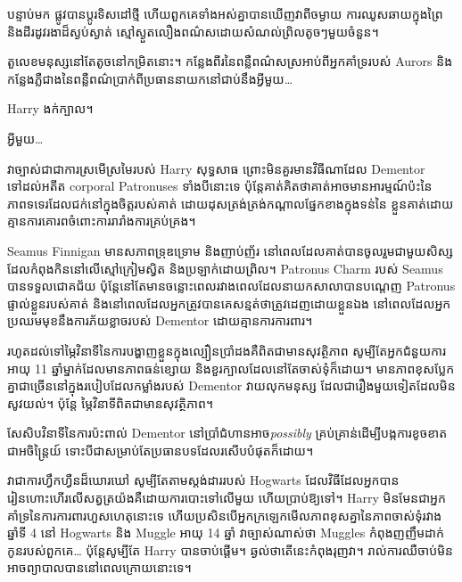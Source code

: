 បន្ទាប់មក ផ្លូវបានប្តូរទិសដៅថ្មី ហើយពួកគេទាំងអស់គ្នាបានឃើញវាពីចម្ងាយ ការឈូសឆាយក្នុងព្រៃ និងដីរដូវរងាដ៏ស្ងប់ស្ងាត់ ស្មៅស្ងួតលឿងពណ៌សដោយសំណល់ព្រិលតូចៗមួយចំនួន។

តួលេខ​មនុស្ស​នៅ​តែ​តូច​នៅ​កម្រិត​នោះ។ កន្លែង​ពីរ​នៃ​ពន្លឺ​ពណ៌​ស​ស្រអាប់​ពី​អ្នក​គាំទ្រ​របស់ Aurors និង​កន្លែង​ភ្លឺ​ជាង​នៃ​ពន្លឺ​ពណ៌​ប្រាក់​ពី​ប្រធាន​នាយក​នៅ​ជាប់​នឹង​អ្វី​មួយ…

Harry ងក់ក្បាល។

អ្វីមួយ…

វាច្បាស់ជាជាការស្រមើស្រមៃរបស់ Harry សុទ្ធសាធ ព្រោះមិនគួរមានវិធីណាដែល Dementor ទៅដល់អតីត corporal Patronuses ទាំងបីនោះទេ ប៉ុន្តែគាត់គិតថាគាត់អាចមានអារម្មណ៍ប៉ះនៃភាពទទេរដែលជក់នៅក្នុងចិត្តរបស់គាត់ ដោយដុសត្រង់ត្រង់កណ្តាលផ្នែកខាងក្នុងទន់នៃ ខ្លួន​គាត់​ដោយ​គ្មាន​ការ​គោរព​ចំពោះ​ការ​រារាំង​ការ​គ្រប់គ្រង​។

\later

Seamus Finnigan មានសភាពទ្រុឌទ្រោម និងញាប់ញ័រ នៅពេលដែលគាត់បានចូលរួមជាមួយសិស្សដែលកំពុងកិននៅលើស្មៅក្រៀមស្វិត និងប្រឡាក់ដោយព្រិល។ Patronus Charm របស់ Seamus បានទទួលជោគជ័យ ប៉ុន្តែនៅតែមានចន្លោះពេលរវាងពេលដែលនាយកសាលាបានបណ្តេញ Patronus ផ្ទាល់ខ្លួនរបស់គាត់ និងនៅពេលដែលអ្នកត្រូវបានគេសន្មត់ថាត្រូវដេញដោយខ្លួនឯង នៅពេលដែលអ្នកប្រឈមមុខនឹងការភ័យខ្លាចរបស់ Dementor ដោយគ្មានការការពារ។

រហូត​ដល់​ទៅ​ម្ភៃ​វិនាទី​នៃ​ការ​បង្ហាញ​ខ្លួន​ក្នុង​ល្បឿន​ប្រាំ​ដង​គឺ​ពិត​ជា​មាន​សុវត្ថិភាព សូម្បី​តែ​អ្នក​ជំនួយ​ការ​អាយុ 11 ឆ្នាំ​ម្នាក់​ដែល​មាន​ភាព​ធន់​ខ្សោយ និង​ខួរក្បាល​ដែល​នៅ​តែ​ចាស់​ទុំ​ក៏​ដោយ។ មានភាពខុសប្លែកគ្នាជាច្រើននៅក្នុងរបៀបដែលកម្លាំងរបស់ Dementor វាយលុកមនុស្ស ដែលជារឿងមួយទៀតដែលមិនសូវយល់។ ប៉ុន្តែ ម្ភៃវិនាទីពិតជាមានសុវត្ថិភាព។

សែសិបវិនាទីនៃការប៉ះពាល់ Dementor នៅប្រាំជំហានអាច\emph{possibly} គ្រប់គ្រាន់ដើម្បីបង្កការខូចខាតជាអចិន្ត្រៃយ៍ ទោះបីជាសម្រាប់តែប្រធានបទដែលរសើបបំផុតក៏ដោយ។

វាជាការហ្វឹកហ្វឺនដ៏ឃោរឃៅ សូម្បីតែតាមស្តង់ដាររបស់ Hogwarts ដែលវិធីដែលអ្នកបានរៀនហោះហើរលើសត្វត្រយ៉ងគឺដោយការបោះទៅលើមួយ ហើយប្រាប់ឱ្យទៅ។ Harry មិនមែនជាអ្នកគាំទ្រនៃការការពារហួសហេតុនោះទេ ហើយប្រសិនបើអ្នកក្រឡេកមើលភាពខុសគ្នានៃភាពចាស់ទុំរវាងឆ្នាំទី 4 នៅ Hogwarts និង Muggle អាយុ 14 ឆ្នាំ វាច្បាស់ណាស់ថា Muggles កំពុងញញឹមដាក់កូនរបស់ពួកគេ… ប៉ុន្តែសូម្បីតែ Harry បានចាប់ផ្តើម។ ឆ្ងល់ថាតើនេះកំពុងរុញវា។ រាល់ការឈឺចាប់មិនអាចព្យាបាលបាននៅពេលក្រោយនោះទេ។

